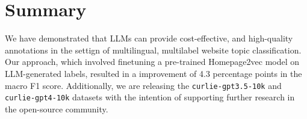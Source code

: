 \section{Summary}\label{sec:summary}

We have demonstrated that LLMs can provide cost-effective, and high-quality annotations in the settign of multilingual, multilabel website topic classification. Our approach, which involved finetuning a pre-trained Homepage2vec model on LLM-generated labels, resulted in a improvement of 4.3 percentage points in the macro F1 score. Additionally, we are releasing the \texttt{curlie-gpt3.5-10k} and \texttt{curlie-gpt4-10k} datasets \cite{curlie-gpt-10k} with the intention of supporting further research in the open-source community.